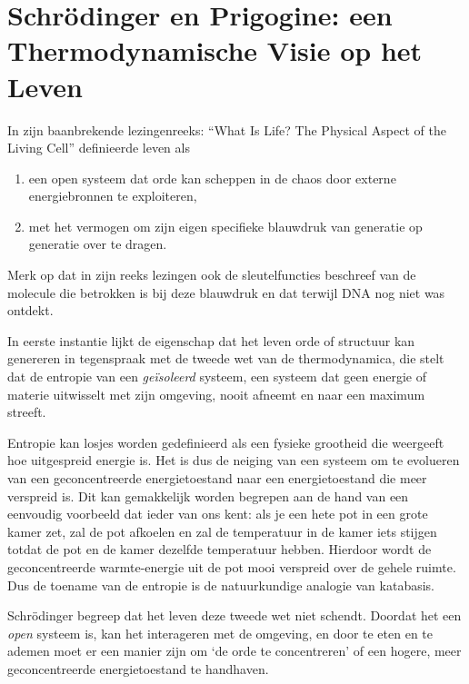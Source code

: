 \documentclass[
  11pt,
]{book}
\begin{document}
\newpage

\section{Schrödinger en Prigogine: een Thermodynamische Visie op het Leven}\label{schrodinger-prigogine}

In zijn baanbrekende lezingenreeks: ``What Is Life? The Physical Aspect of the Living Cell'' definieerde \citet{schrodinger1944} leven als

\begin{enumerate}
\def\labelenumi{\arabic{enumi}.}
\item
  een open systeem dat orde kan scheppen in de chaos door externe energiebronnen te exploiteren,
\item
  met het vermogen om zijn eigen specifieke blauwdruk van generatie op generatie over te dragen.
\end{enumerate}

Merk op dat \citet{schrodinger1944} in zijn reeks lezingen ook de sleutelfuncties beschreef van de molecule die betrokken is bij deze blauwdruk en dat terwijl DNA nog niet was ontdekt.

In eerste instantie lijkt de eigenschap dat het leven orde of structuur kan genereren in tegenspraak met de tweede wet van de thermodynamica, die stelt dat de entropie van een \emph{geïsoleerd} systeem, een systeem dat geen energie of materie uitwisselt met zijn omgeving, nooit afneemt en naar een maximum streeft.

Entropie kan losjes worden gedefinieerd als een fysieke grootheid die weergeeft hoe uitgespreid energie is. Het is dus de neiging van een systeem om te evolueren van een geconcentreerde energietoestand naar een energietoestand die meer verspreid is. Dit kan gemakkelijk worden begrepen aan de hand van een eenvoudig voorbeeld dat ieder van ons kent: als je een hete pot in een grote kamer zet, zal de pot afkoelen en zal de temperatuur in de kamer iets stijgen totdat de pot en de kamer dezelfde temperatuur hebben. Hierdoor wordt de geconcentreerde warmte-energie uit de pot mooi verspreid over de gehele ruimte. Dus de toename van de entropie is de natuurkundige analogie van katabasis.

Schrödinger begreep dat het leven deze tweede wet niet schendt. Doordat het een \emph{open} systeem is, kan het interageren met de omgeving, en door te eten en te ademen moet er een manier zijn om `de orde te concentreren' of een hogere, meer geconcentreerde energietoestand te handhaven.
\end{document}
